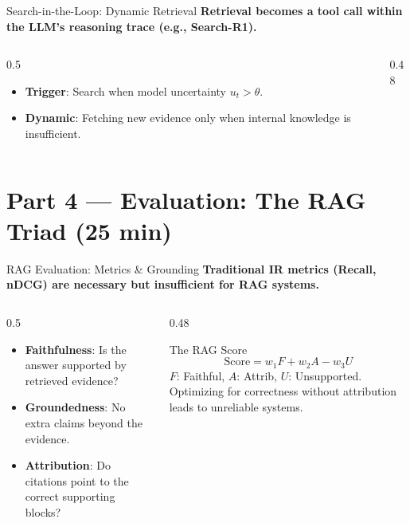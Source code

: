 \documentclass[aspectratio=169, xcolor=table]{beamer}
\begin{document}
\begin{frame}{Search-in-the-Loop: Dynamic Retrieval}
\textbf{Retrieval becomes a tool call within the LLM's reasoning trace (e.g., Search-R1).}

\vspace{0.8em}
\begin{columns}[T]
\begin{column}{0.5\textwidth}
\begin{itemize}
    \item \textbf{Trigger}: Search when model uncertainty $u_t > \theta$.
    \item \textbf{Dynamic}: Fetching new evidence only when internal knowledge is insufficient.
\end{itemize}
\end{column}
\begin{column}{0.48\textwidth}
\begin{center}
\resizebox{\textwidth}{!}{

}
\end{center}
\end{column}
\end{columns}
\end{frame}

\section{Part 4 --- Evaluation: The RAG Triad (25 min)}

\begin{frame}[plain]
\sectionpage
\end{frame}

\begin{frame}{RAG Evaluation: Metrics \& Grounding}
\textbf{Traditional IR metrics (Recall, nDCG) are necessary but insufficient for RAG systems.}

\vspace{0.8em}
\begin{columns}[T]
\begin{column}{0.5\textwidth}
\begin{itemize}
    \item \textbf{Faithfulness}: Is the answer supported by retrieved evidence?
    \item \textbf{Groundedness}: No extra claims beyond the evidence.
    \item \textbf{Attribution}: Do citations point to the correct supporting blocks?
\end{itemize}
\end{column}
\begin{column}{0.48\textwidth}
\begin{alertblock}{The RAG Score}
\small
\[ \text{Score} = w_1 F + w_2 A - w_3 U \]
\tiny $F$: Faithful, $A$: Attrib, $U$: Unsupported.
\footnotesize
Optimizing for correctness without attribution leads to unreliable systems.
\end{alertblock}
\end{column}
\end{columns}
\end{frame}
\end{document}
